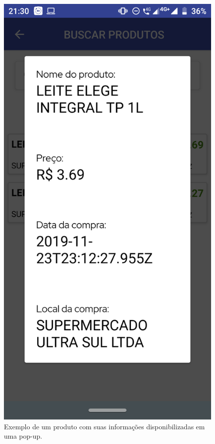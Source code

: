 \begin{figure}[h]
    \centering
    \includegraphics[scale=0.15]{tcc/figures/app/app_buscar_produtos_produto.png}
    \caption{Exemplo de um produto com suas informações disponibilizadas em uma pop-up.}
    \label{appBuscaProdutosProdutoAmpliadoFig}
\end{figure}

